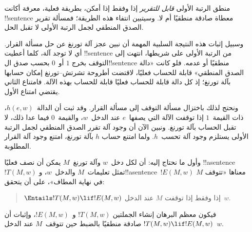 \documentclass[../../../include/open-logic-section]{subfiles}
\begin{document}

منطق الرتبة الأولى \emph{قابل للتقرير} إذا وفقط إذا أمكن، بطريقة
فعلية، معرفة أكانت !!{sentence} معطاة صادقة منطقيًا أم لا.
وسيتبين انتفاء هذه الطريقة؛ فمسألة تقرير الصدق المنطقي لجمل
الرتبة الأولى لا تقبل الحل.

وسبيل إثبات هذه النتيجة السلبية المهمة أن نبين عجز آلة تورنغ عن
حل مسألة القرار. أي لا توجد آلة، كلما أعطيت !!{sentence} من الرتبة
الأولى على شريطها، انتهت إلى التوقف بخرج $1$ أو~$0$ بحسب صدق
ال!!{sentence} منطقيًا أو عدمه. فلو كانت «دالة الصدق المنطقي»
قابلة للحساب فعليًا، لاقتضت أطروحة تشرتش--تورنغ إمكان حسابها بآلة
تورنغ؛ إذ كل دالة قابلة للحساب فعليًا قابلة للحساب بهذه الآلة.
فامتناع الثاني يقتضي امتناع الأول.

ونحتج لذلك باختزال مسألة التوقف إلى مسألة القرار. وقد ثبت أن
الدالة~$h(e,w)$، ذات القيمة~$1$ إذا توقفت الآلة التي يصفها~$e$
عند الدخل~$w$، والقيمة~$0$ فيما عدا ذلك، لا تقبل الحساب بآلة
تورنغ. ونبين الآن أن وجود آلة تقرر الصدق المنطقي لجمل الرتبة
الأولى يستلزم وجود آلة تحسب~$h$. ولما امتنع حساب $h$ بآلة
تورنغ، امتنع وجود آلة القرار المطلوبة.

وأول ما نحتاج إليه: أن لكل دخل~$w$ وآلة تورنغ~$M$ يمكن أن
نصف فعليًا !!a{sentence}~$!T(M,w)$ تمثل تعليمات~$M$
والدخل~$w$، و!!a{sentence}~$!E(M,w)$ معناها «تتوقف $M$
في نهاية المطاف»، على أن يتحقق:
\begin{quote}
  $\Entails !T(M,w) \lif !E(M,w)$ إذا وفقط إذا توقفت $M$ عند الدخل~$w$.
\end{quote}
فيكون معظم البرهان إنشاء الجملتين $!T(M,w)$ و~$!E(M,w)$،
وإثبات أن $!T(M,w)\lif !E(M,w)$ صادقة منطقيًا بالضبط حين
تتوقف~$M$ عند الدخل~$w$.
\end{document}
